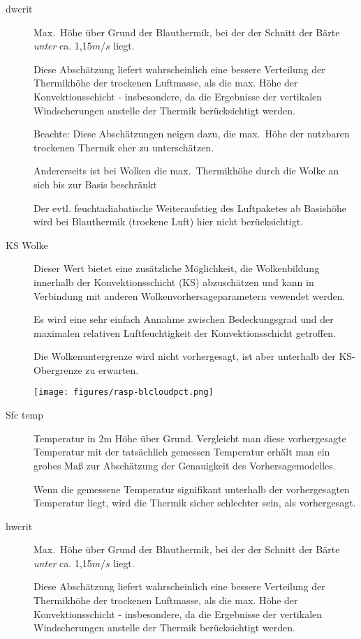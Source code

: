 \begin{description}
\item[dwcrit]
Max.\ Höhe über Grund der Blauthermik, bei der der Schnitt der Bärte  \textsl{unter} ca. 1,15$m/s$ liegt.

Diese Abschätzung liefert  wahrscheinlich eine bessere Verteilung der Thermikhöhe
der trockenen Luftmasse, als die max. Höhe der Konvektionsschicht - insbesondere, 
da die Ergebnisse der vertikalen Windscherungen anstelle der Thermik berücksichtigt
werden.


Beachte: Diese Abschätzungen neigen dazu, die max.\ Höhe der
nutzbaren trockenen Thermik eher zu unterschätzen.

Andererseits ist bei Wolken die max.\ Thermikhöhe durch  die Wolke an sich bis
zur Basis  beschränkt

Der evtl. feuchtadiabatische Weiteraufstieg des Luftpaketes ab Basishöhe wird bei
Blauthermik (trockene Luft) hier nicht berücksichtigt.

\item[KS Wolke]
Dieser Wert bietet eine zusätzliche Möglichkeit, die Wolkenbildung innerhalb der
Konvektionsschicht (KS) abzuschätzen und kann in Verbindung mit anderen
Wolkenvorhersageparametern vewendet werden.

Es wird eine sehr einfach Annahme zwischen Bedeckungsgrad und der maximalen
relativen Luftfeuchtigkeit der Konvektionsschicht getroffen.

Die Wolkenuntergrenze wird nicht vorhergesagt, ist aber unterhalb der
 KS-Obergrenze zu erwarten.


\begin{center}
\texttt{[image: figures/rasp-blcloudpct.png]}
\end{center}

\item[Sfc temp]

Temperatur in 2m Höhe über Grund.
Vergleicht man diese vorhergesagte Temperatur mit der tatsächlich gemessen Temperatur
erhält man ein grobes Maß  zur Abschätzung der Genauigkeit des Vorhersagemodelles.

Wenn die gemessene Temperatur signifikant unterhalb der vorhergesagten Temperatur
liegt, wird die Thermik sicher schlechter sein, als vorhergesagt.
\item[hwcrit]
Max.\ Höhe über Grund der Blauthermik, bei der der Schnitt der Bärte  \textsl{unter} ca. 1,15$m/s$ liegt.

Diese Abschätzung liefert  wahrscheinlich eine bessere Verteilung der Thermikhöhe
der trockenen Luftmasse, als die max. Höhe der Konvektionsschicht - insbesondere,
da die Ergebnisse der vertikalen Windscherungen anstelle der Thermik berücksichtigt
werden.


\end{description}

